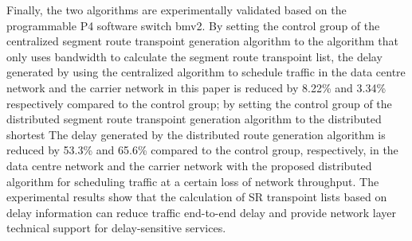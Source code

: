 {Finally, the two algorithms are experimentally validated based on the programmable P4 software switch bmv2. By setting the control group of the centralized segment route transpoint generation algorithm to the algorithm that only uses bandwidth to calculate the segment route transpoint list, the delay generated by using the centralized algorithm to schedule traffic in the data centre network and the carrier network in this paper is reduced by 8.22\% and 3.34\% respectively compared to the control group; by setting the control group of the distributed segment route transpoint generation algorithm to the distributed shortest The delay generated by the distributed route generation algorithm is reduced by 53.3\% and 65.6\% compared to the control group, respectively, in the data centre network and the carrier network with the proposed distributed algorithm for scheduling traffic at a certain loss of network throughput. The experimental results show that the calculation of SR transpoint lists based on delay information can reduce traffic end-to-end delay and provide network layer technical support for delay-sensitive services.
}

